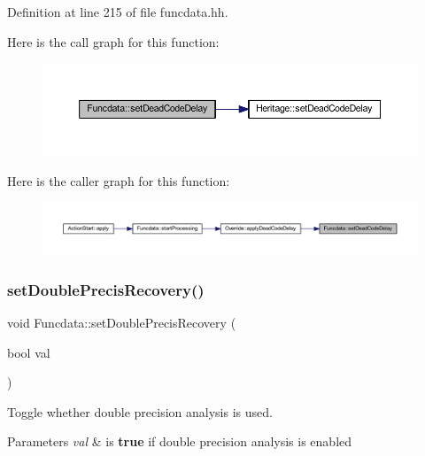 Definition at line 215 of file funcdata.\+hh.

Here is the call graph for this function\+:
\nopagebreak
\begin{figure}[H]
\begin{center}
\leavevmode
\includegraphics[width=350pt]{class_funcdata_ac40aef88ca7a101e4697df5e0ec5f605_cgraph}
\end{center}
\end{figure}
Here is the caller graph for this function\+:
\nopagebreak
\begin{figure}[H]
\begin{center}
\leavevmode
\includegraphics[width=350pt]{class_funcdata_ac40aef88ca7a101e4697df5e0ec5f605_icgraph}
\end{center}
\end{figure}
\mbox{\label{class_funcdata_a23bcddc7a3b959812f9a1660b39cc6ef}} 
\subsubsection{\texorpdfstring{setDoublePrecisRecovery()}{setDoublePrecisRecovery()}}
{\footnotesize\ttfamily void Funcdata\+::set\+Double\+Precis\+Recovery (\begin{DoxyParamCaption}\item[{bool}]{val }\end{DoxyParamCaption})\hspace{0.3cm}{\ttfamily [inline]}}



Toggle whether double precision analysis is used. 


\begin{DoxyParams}{Parameters}
{\em val} & is {\bfseries{true}} if double precision analysis is enabled \\
\hline
\end{DoxyParams}



